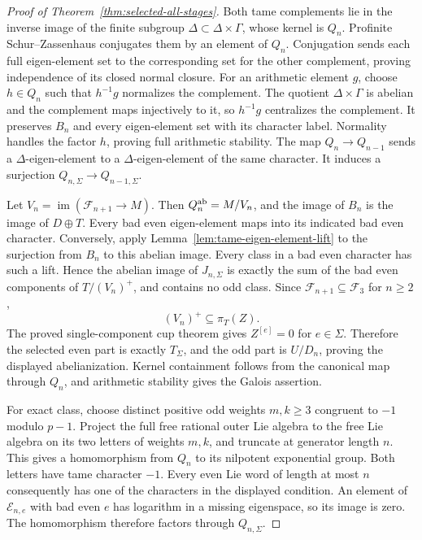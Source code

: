 \begin{proof}[Proof of Theorem~\ref{thm:selected-all-stages}]
Both tame complements lie in the inverse image of the finite subgroup \(\Delta\subset\Delta\times\Gamma\), whose kernel is \(Q_n\). Profinite Schur--Zassenhaus conjugates them by an element of \(Q_n\). Conjugation sends each full eigen-element set to the corresponding set for the other complement, proving independence of its closed normal closure. For an arithmetic element \(g\), choose \(h\in Q_n\) such that \(h^{-1}g\) normalizes the complement. The quotient \(\Delta\times\Gamma\) is abelian and the complement maps injectively to it, so \(h^{-1}g\) centralizes the complement. It preserves \(B_n\) and every eigen-element set with its character label. Normality handles the factor \(h\), proving full arithmetic stability. The map \(Q_n\to Q_{n-1}\) sends a
\(\Delta\)-eigen-element to a \(\Delta\)-eigen-element of
the same character. It induces a surjection
\(Q_{n,\Sigma}\to Q_{n-1,\Sigma}\).

Let \(V_n=\operatorname{im}(\mathcal F_{n+1}\to M)\). Then
\(Q_n^{\rm ab}=M/V_n\), and the image of \(B_n\) is the
image of \(D\oplus T\). Every bad even eigen-element maps
into its indicated bad even character. Conversely, apply
Lemma~\ref{lem:tame-eigen-element-lift} to the surjection
from \(B_n\) to this abelian image. Every class in a bad
even character has such a lift. Hence the abelian image of
\(J_{n,\Sigma}\) is exactly the sum of the bad even
components of \(T/(V_n)^+\), and contains no odd class.
Since \(\mathcal F_{n+1}\subseteq \mathcal F_3\) for \(n\geq2\),
\[
                   (V_n)^+\subseteq\pi_T(Z).
\]
The proved single-component cup theorem gives
\(Z^{[e]}=0\) for \(e\in\Sigma\). Therefore the selected
even part is exactly \(T_\Sigma\), and the odd part is
\(U/D_n\), proving the displayed abelianization.
Kernel containment follows from the canonical map through
\(Q_n\), and arithmetic stability gives the Galois assertion.

For exact class, choose distinct positive odd weights
\(m,k\geq3\) congruent to \(-1\) modulo \(p-1\).
Project the full free rational outer Lie algebra to the
free Lie algebra on its two letters of weights \(m,k\),
and truncate at generator length \(n\). This gives a
homomorphism from \(Q_n\) to its nilpotent exponential group.
Both letters have tame character \(-1\). Every even Lie
word of length at most \(n\) consequently has one of the
characters in the displayed condition. An element of
\(\mathcal E_{n,e}\) with bad even \(e\) has logarithm in
a missing eigenspace, so its image is zero. The homomorphism
therefore factors through \(Q_{n,\Sigma}\).


\end{proof}
